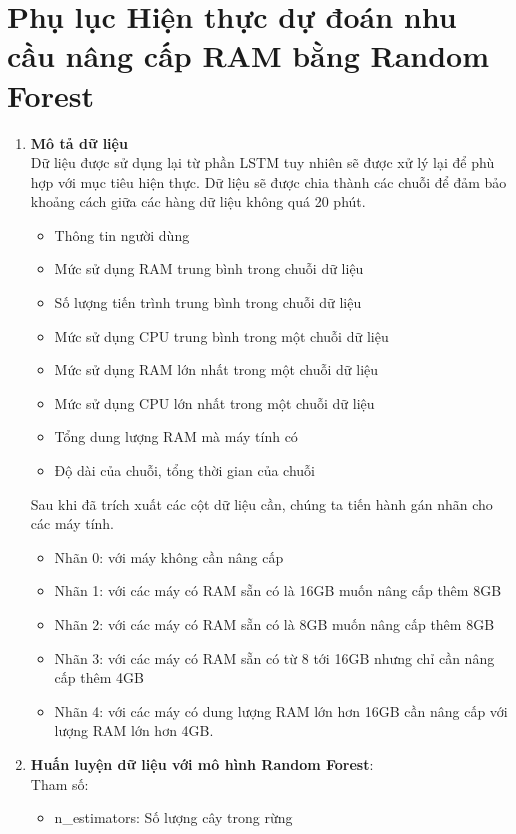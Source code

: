 \section{Phụ lục Hiện thực dự đoán nhu cầu nâng cấp RAM bằng Random Forest}
\begin{enumerate}
    \item \textbf{Mô tả dữ liệu}\\
    Dữ liệu được sử dụng lại từ phần LSTM tuy nhiên sẽ được xử lý lại để phù hợp với mục tiêu hiện thực. Dữ liệu sẽ được chia thành các chuỗi để đảm bảo khoảng cách giữa các hàng dữ liệu không quá 20 phút.
    \begin{itemize}[label=--]
        \item Thông tin người dùng
        \item Mức sử dụng RAM trung bình trong chuỗi dữ liệu
        \item Số lượng tiến trình trung bình trong chuỗi dữ liệu
        \item Mức sử dụng CPU trung bình trong một chuỗi dữ liệu
        \item Mức sử dụng RAM lớn nhất trong một chuỗi dữ liệu
        \item Mức sử dụng CPU lớn nhất trong một chuỗi dữ liệu
        \item Tổng dung lượng RAM mà máy tính có
        \item Độ dài của chuỗi, tổng thời gian của chuỗi
    \end{itemize}
     Sau khi đã trích xuất các cột dữ liệu cần, chúng ta tiến hành gán nhãn cho các máy tính. 
     \begin{itemize}[label=--]
        \item Nhãn 0: với máy không cần nâng cấp
        \item Nhãn 1: với các máy có RAM sẵn có là 16GB muốn nâng cấp thêm 8GB
        \item Nhãn 2: với các máy có RAM sẵn có là 8GB muốn nâng cấp thêm 8GB
        \item Nhãn 3: với các máy có RAM sẵn có từ 8 tới 16GB nhưng chỉ cần nâng cấp thêm 4GB
        \item Nhãn 4: với các máy có dung lượng RAM lớn hơn 16GB cần nâng cấp với lượng RAM lớn hơn 4GB.
     \end{itemize}
     \item \textbf{Huấn luyện dữ liệu với mô hình Random Forest}:\\
    Tham số:
    \begin{itemize}[label=--]
        \item n\_estimators: Số lượng cây trong rừng

\end{itemize}
\end{enumerate}
